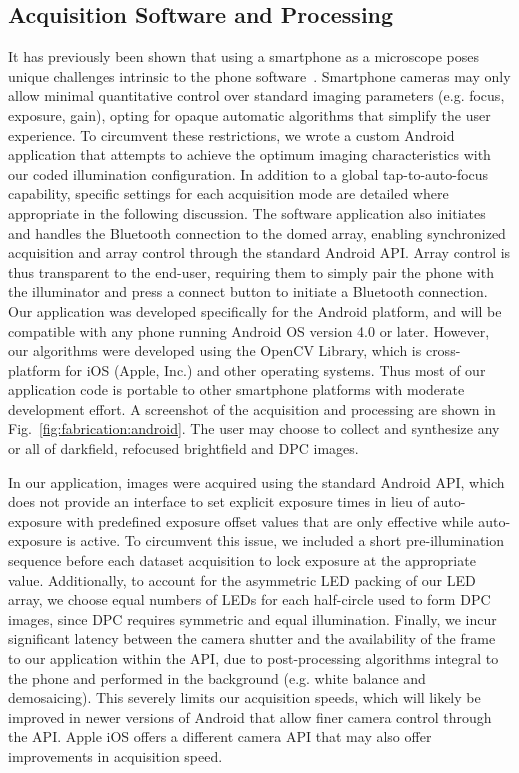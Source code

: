 \subsection{Acquisition Software and Processing}
It has previously been shown that using a smartphone as a microscope poses unique challenges intrinsic to the phone software~\cite{skandarajah2014quantitative}. Smartphone cameras may only allow minimal quantitative control over standard imaging parameters (e.g. focus, exposure, gain), opting for opaque automatic algorithms that simplify the user experience. To circumvent these restrictions, we wrote a custom Android application that attempts to achieve the optimum imaging characteristics with our coded illumination configuration. In addition to a global tap-to-auto-focus capability, specific settings for each acquisition mode are detailed where appropriate in the following discussion. The software application also initiates and handles the Bluetooth connection to the domed array, enabling synchronized acquisition and array control through the standard Android API. Array control is thus transparent to the end-user, requiring them to simply pair the phone with the illuminator and press a connect button to initiate a Bluetooth connection. Our application was developed specifically for the Android platform, and will be compatible with any phone running Android OS version 4.0 or later. However, our algorithms were developed using the OpenCV Library, which is cross-platform for iOS (Apple, Inc.) and other operating systems. Thus most of our application code is portable to other smartphone platforms with moderate development effort. A screenshot of the acquisition and processing are shown in Fig.~\ref{fig:fabrication:android}. The user may choose to collect and synthesize any or all of darkfield, refocused brightfield and DPC images.

In our application, images were acquired using the standard Android API, which does not provide an interface to set explicit exposure times in lieu of auto-exposure with predefined exposure offset values that are only effective while auto-exposure is active. To circumvent this issue, we included a short pre-illumination sequence before each dataset acquisition to lock exposure at the appropriate value. Additionally, to account for the asymmetric LED packing of our LED array, we choose equal numbers of LEDs for each half-circle used to form DPC images, since DPC requires symmetric and equal illumination. Finally, we incur significant latency between the camera shutter and the availability of the frame to our application within the API, due to post-processing algorithms integral to the phone and performed in the background (e.g. white balance and demosaicing). This severely limits our acquisition speeds, which will likely be improved in newer versions of Android that allow finer camera control through the API. Apple iOS offers a different camera API that may also offer improvements in acquisition speed.

